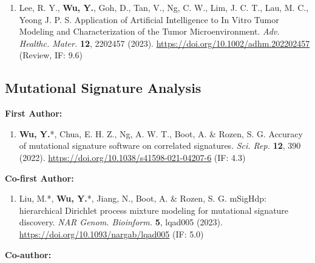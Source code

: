 \documentclass[11pt,a4paper]{article}
\newcommand{\urltext}[1]{\href{#1}{#1}}
\begin{document}
\begin{enumerate}[leftmargin=*,nosep,resume]
\item Lee, R. Y., \textbf{Wu, Y.}, Goh, D., Tan, V., Ng, C. W., Lim, J. C. T., Lau, M. C., Yeong J. P. S. Application of Artificial Intelligence to In Vitro Tumor Modeling and Characterization of the Tumor Microenvironment. \textit{Adv. Healthc. Mater.} \textbf{12}, 2202457 (2023). \urltext{https://doi.org/10.1002/adhm.202202457} (Review, IF: 9.6)
\end{enumerate}

\subsection*{Mutational Signature Analysis}

\textbf{First Author:}

\begin{enumerate}[leftmargin=*,nosep,resume]
\item \textbf{Wu, Y.}*, Chua, E. H. Z., Ng, A. W. T., Boot, A. \& Rozen, S. G. Accuracy of mutational signature software on correlated signatures. \textit{Sci. Rep.} \textbf{12}, 390 (2022). \urltext{https://doi.org/10.1038/s41598-021-04207-6} (IF: 4.3)
\end{enumerate}

\textbf{Co-first Author:}

\begin{enumerate}[leftmargin=*,nosep,resume]
\item Liu, M.*, \textbf{Wu, Y.}*, Jiang, N., Boot, A. \& Rozen, S. G. mSigHdp: hierarchical Dirichlet process mixture modeling for mutational signature discovery. \textit{NAR Genom. Bioinform.} \textbf{5}, lqad005 (2023). \urltext{https://doi.org/10.1093/nargab/lqad005} (IF: 5.0)
\end{enumerate}

\textbf{Co-author:}
\end{document}
